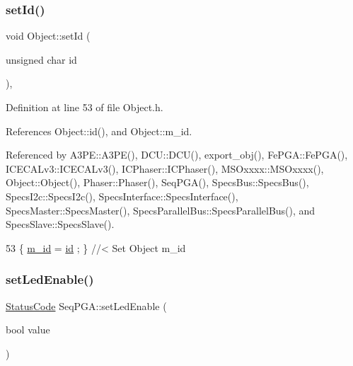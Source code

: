 \subsubsection{\texorpdfstring{set\+Id()}{setId()}}
{\footnotesize\ttfamily void Object\+::set\+Id (\begin{DoxyParamCaption}\item[{unsigned char}]{id }\end{DoxyParamCaption})\hspace{0.3cm}{\ttfamily [inline]}, {\ttfamily [inherited]}}



Definition at line 53 of file Object.\+h.



References Object\+::id(), and Object\+::m\+\_\+id.



Referenced by A3\+P\+E\+::\+A3\+P\+E(), D\+C\+U\+::\+D\+C\+U(), export\+\_\+obj(), Fe\+P\+G\+A\+::\+Fe\+P\+G\+A(), I\+C\+E\+C\+A\+Lv3\+::\+I\+C\+E\+C\+A\+Lv3(), I\+C\+Phaser\+::\+I\+C\+Phaser(), M\+S\+Oxxxx\+::\+M\+S\+Oxxxx(), Object\+::\+Object(), Phaser\+::\+Phaser(), Seq\+P\+G\+A(), Specs\+Bus\+::\+Specs\+Bus(), Specs\+I2c\+::\+Specs\+I2c(), Specs\+Interface\+::\+Specs\+Interface(), Specs\+Master\+::\+Specs\+Master(), Specs\+Parallel\+Bus\+::\+Specs\+Parallel\+Bus(), and Specs\+Slave\+::\+Specs\+Slave().


\begin{DoxyCode}
53 \{ \hyperlink{classObject_aca74b9dbfed7b5556ea2d56c65b6b6b0}{m\_id}    = \hyperlink{classObject_af99145335cc61ff6e2798ea17db009d2}{id}    ; \} \textcolor{comment}{//< Set Object m\_id}
\end{DoxyCode}
\mbox{\label{classSeqPGA_a2e256a39e1bc4fbfa23de3760a7bd19a}} 
\subsubsection{\texorpdfstring{set\+Led\+Enable()}{setLedEnable()}}
{\footnotesize\ttfamily \hyperlink{classStatusCode}{Status\+Code} Seq\+P\+G\+A\+::set\+Led\+Enable (\begin{DoxyParamCaption}\item[{bool}]{value }\end{DoxyParamCaption})}



